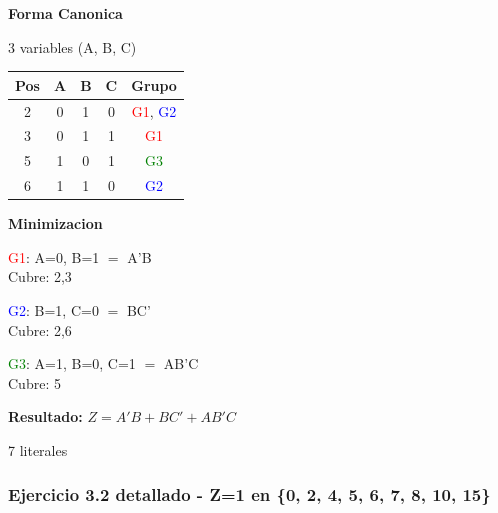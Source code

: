 \documentclass[12pt,a4paper]{article}
\begin{document}
\vspace{0.3cm}

\begin{minipage}[t]{0.58\textwidth}
\textbf{Forma Canonica}

3 variables (A, B, C)

\begin{tabular}{|c|c|c|c|c|}
\hline
Pos & A & B & C & Grupo \\
\hline
2 & 0 & 1 & 0 & \textcolor{red}{G1}, \textcolor{blue}{G2} \\
3 & 0 & 1 & 1 & \textcolor{red}{G1} \\
5 & 1 & 0 & 1 & \textcolor{green}{G3} \\
6 & 1 & 1 & 0 & \textcolor{blue}{G2} \\
\hline
\end{tabular}
\end{minipage}
\hspace{0.3cm}
\begin{minipage}[t]{0.38\textwidth}
\textbf{Minimizacion}

\vspace{0.2cm}
\textcolor{red}{G1}: A=0, B=1 $=$ A'B \\ Cubre: 2,3

\vspace{0.2cm}
\textcolor{blue}{G2}: B=1, C=0 $=$ BC' \\ Cubre: 2,6

\vspace{0.2cm}
\textcolor{green}{G3}: A=1, B=0, C=1 $=$ AB'C \\ Cubre: 5

\vspace{0.3cm}
\textbf{Resultado:} $Z = A'B + BC' + AB'C$

7 literales
\end{minipage}

\vspace{0.5cm}

\subsubsection{Ejercicio 3.2 detallado - Z=1 en \{0, 2, 4, 5, 6, 7, 8, 10, 15\}}

\vspace{0.3cm}
\end{document}

